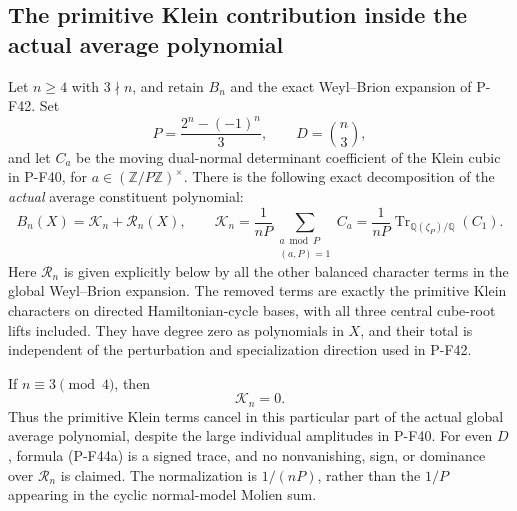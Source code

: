 \subsection{The primitive Klein contribution inside the actual average polynomial}

\begin{proposition}
\label{prop:kleinglobalcontribution}
Let $n\ge4$ with $3\nmid n$, and retain $B_n$ and the exact
Weyl--Brion expansion of P-F42. Set
\[
 P=\frac{2^n-(-1)^n}{3},\qquad D=\binom n3,
\]
and let $C_a$ be the moving dual-normal determinant coefficient
of the Klein cubic in P-F40, for $a\in(\mathbb Z/P\mathbb Z)^\times$.
There is the following exact decomposition of the \emph{actual}
average constituent polynomial:
\[
 B_n(X)=\mathcal K_n+\mathcal R_n(X),\qquad
 \mathcal K_n=
   \frac1{nP}\sum_{\substack{a\bmod P\\(a,P)=1}}C_a
   =\frac1{nP}\operatorname{Tr}_{\mathbb Q(\zeta_P)/\mathbb Q}(C_1).
 \tag{P-F44a}
\]
Here $\mathcal R_n$ is given explicitly below by all the other
balanced character terms in the global Weyl--Brion expansion.
The removed terms are exactly the primitive Klein characters
on directed Hamiltonian-cycle bases, with all three central
cube-root lifts included.
They have degree zero as polynomials in $X$, and their total
is independent of the perturbation and specialization direction
used in P-F42.

If $n\equiv3\pmod4$, then
\[
                              \mathcal K_n=0.
 \tag{P-F44b}
\]
Thus the primitive Klein terms cancel in this particular
part of the actual global average polynomial, despite the
large individual amplitudes in P-F40.
For even $D$, formula (P-F44a) is a signed trace, and no
nonvanishing, sign, or dominance over $\mathcal R_n$ is claimed.
The normalization is $1/(nP)$, rather than the $1/P$ appearing
in the cyclic normal-model Molien sum.
\end{proposition}

